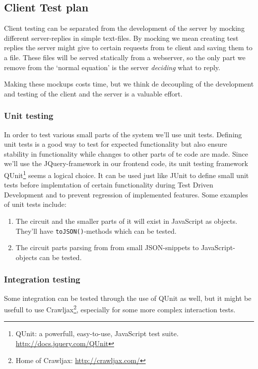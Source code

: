 \subsection{Client Test plan}
Client testing can be separated from the development of the server by mocking different server-replies in simple text-files. By mocking we mean creating test replies the server might give to certain requests from te client and saving them to a file. These files will be served statically from a webserver, so the only part we remove from the `normal equation' is the server \textit{deciding} what to reply.

Making these mockups costs time, but we think de decoupling of the development and testing of the client and the server is a valuable effort.

\subsubsection{Unit testing}
In order to test various small parts of the system we'll use unit tests. Defining unit tests is a good way to test for expected functionality but also ensure stability in functionality while changes to other parts of te code are made. Since we'll use the JQuery-framework in our frontend code, its unit testing framework QUnit\footnote{QUnit: a powerfull, easy-to-use, JavaScript test suite. \url{http://docs.jquery.com/QUnit}} seems a logical choice. It can be used just like JUnit to define small unit tests before implemtation of certain functionality during Test Driven Development and to prevent regression of implemented features. Some examples of unit tests include:
\begin{enumerate}
	\item The circuit and the smaller parts of it will exist in JavaScript as objects. They'll have \verb|toJSON()|-methods which can be tested.
	\item The circuit parts parsing from from small JSON-snippets to JavaScript-objects can be tested.
\end{enumerate}

\subsubsection{Integration testing}
Some integration can be tested through the use of QUnit as well, but it might be usefull to use Crawljax\footnote{Home of Crawljax: \url{http://crawljax.com/}}, especially for some more complex interaction tests.

